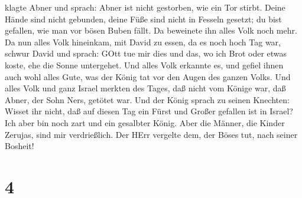 klagte Abner und sprach: Abner ist nicht gestorben, wie ein Tor stirbt.
 Deine Hände sind nicht gebunden, deine Füße sind nicht in
Fesseln gesetzt; du bist gefallen, wie man vor bösen Buben fällt. Da
beweinete ihn alles Volk noch mehr.  Da nun alles Volk
hineinkam, mit David zu essen, da es noch hoch Tag war, schwur David und
sprach: GOtt tue mir dies und das, wo ich Brot oder etwas koste, ehe die
Sonne untergehet.  Und alles Volk erkannte es, und gefiel
ihnen auch wohl alles Gute, was der König tat vor den Augen des ganzen
Volks.  Und alles Volk und ganz Israel merkten des Tages,
daß nicht vom Könige war, daß Abner, der Sohn Ners, getötet war.
 Und der König sprach zu seinen Knechten: Wisset ihr nicht,
daß auf diesen Tag ein Fürst und Großer gefallen ist in Israel?
 Ich aber bin noch zart und ein gesalbter König. Aber die
Männer, die Kinder Zerujas, sind mir verdrießlich. Der HErr vergelte
dem, der Böses tut, nach seiner Bosheit!

\hypertarget{section-3}{%
\section{4}\label{section-3}}

